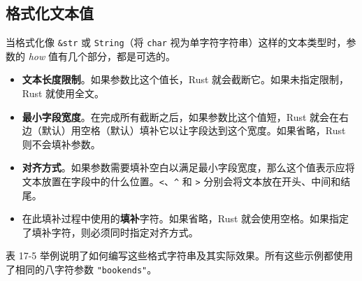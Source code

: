 \subsection{格式化文本值}

当格式化像 \texttt{\&str} 或 \texttt{String}（将 \texttt{char} 视为单字符字符串）这样的文本类型时，参数的 \emph{how} 值有几个部分，都是可选的。

\begin{itemize}
\item \textbf{文本长度限制}。如果参数比这个值长，Rust 就会截断它。如果未指定限制，Rust 就使用全文。
\item \textbf{最小字段宽度}。在完成所有截断之后，如果参数比这个值短，Rust 就会在右边（默认）用空格（默认）填补它以让字段达到这个宽度。如果省略，Rust 则不会填补参数。
\item \textbf{对齐方式}。如果参数需要填补空白以满足最小字段宽度，那么这个值表示应将文本放置在字段中的什么位置。\texttt{<}、\texttt{\textasciicircum{}} 和 \texttt{>} 分别会将文本放在开头、中间和结尾。
\item 在此填补过程中使用的\textbf{填补}字符。如果省略，Rust 就会使用空格。如果指定了填补字符，则必须同时指定对齐方式。
\end{itemize}

表 17-5 举例说明了如何编写这些格式字符串及其实际效果。所有这些示例都使用了相同的八字符参数 \texttt{"bookends"}。



